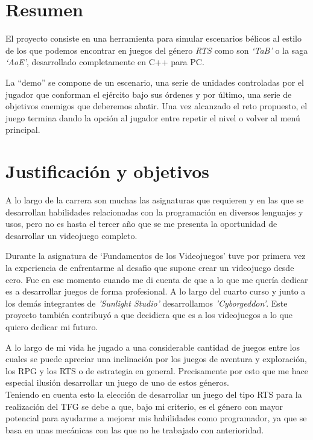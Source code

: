 \chapter*{Resumen}
\label{Resumen}

El proyecto consiste en una herramienta para simular escenarios 
bélicos al estilo de los que podemos encontrar en juegos del género \textit{\ac{RTS}} como son
\textit{`\ac{TaB}'} o la saga \textit{`\ac{AoE}'}, desarrollado
completamente en C++ para \ac{PC}.

La ``demo'' se compone de un escenario, una serie de unidades controladas por el jugador
que conforman el ejército bajo sus órdenes y por último, una serie de objetivos enemigos
que deberemos abatir. Una vez alcanzado el reto propuesto, el juego termina dando la opción 
al jugador entre repetir el nivel o volver al menú principal.

\chapter*{Justificación y objetivos}
A lo largo de la carrera son muchas las asignaturas que requieren y en las que se desarrollan
habilidades relacionadas con la programación en diversos lenguajes y usos, 
pero no es hasta el tercer año que se me presenta la oportunidad de desarrollar
un videojuego completo. 

Durante la asignatura de `Fundamentos de los Videojuegos' tuve por primera vez
la experiencia de enfrentarme al desafio que supone crear un videojuego desde cero.
Fue en ese momento cuando me di cuenta de que a lo que me quería dedicar es a
desarrollar juegos de forma profesional. A lo largo del cuarto curso y junto a los demás
integrantes de \textit{'Sunlight Studio'} desarrollamos \textit{'Cyborgeddon'}. Este proyecto
también contribuyó a que decidiera que es a los videojuegos a lo que quiero dedicar mi futuro.

A lo largo de mi vida he jugado a una considerable cantidad de juegos entre los cuales
se puede apreciar una inclinación por los juegos de aventura y exploración, los 
\ac{RPG} y los \ac{RTS} o de estrategia en general. Precisamente por esto que me hace especial
ilusión desarrollar un juego de uno de estos géneros.\\
Teniendo en cuenta esto la elección de desarrollar un juego del tipo \ac{RTS} para la
realización del \ac{TFG} se debe a que, bajo mi criterio, es el género con mayor
potencial para ayudarme a mejorar mis habilidades como programador, ya que se basa en
unas mecánicas con las que no he trabajado con anterioridad.

